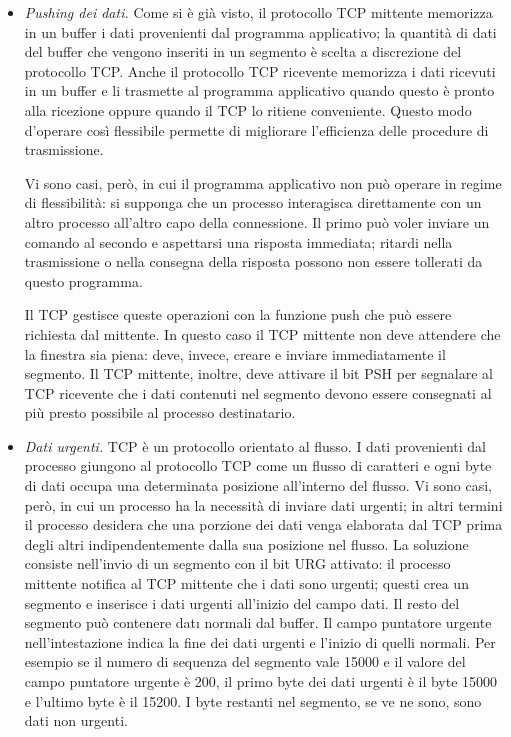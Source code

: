 \begin{itemize}
    \item \textit{Pushing dei dati.} Come si è già visto, il protocollo TCP mittente memorizza in un buffer i dati provenienti dal programma applicativo; la quantità di dati del buffer che vengono inseriti in un segmento è scelta a discrezione del protocollo TCP. Anche il protocollo TCP ricevente memorizza i dati ricevuti in un buffer e li trasmette al programma applicativo quando questo è pronto alla ricezione oppure quando il TCP lo ritiene conveniente. Questo modo d'operare così flessibile permette di migliorare l'efficienza delle procedure di trasmissione.

    Vi sono casi, però, in cui il programma applicativo non può operare in regime di flessibilità: si supponga che un processo interagisca direttamente con un altro processo all'altro capo della connessione. Il primo può voler inviare un comando al secondo e aspettarsi una risposta immediata; ritardi nella trasmissione o nella consegna della risposta possono non essere tollerati da questo programma.

    Il TCP gestisce queste operazioni con la funzione push che può essere richiesta dal mittente. In questo caso il TCP mittente non deve attendere che la finestra sia piena: deve, invece, creare e inviare immediatamente il segmento. Il TCP mittente, inoltre, deve attivare il bit PSH per segnalare al TCP ricevente che i dati contenuti nel segmento devono essere consegnati al più presto possibile al processo destinatario.

    \item \textit{Dati urgenti.} TCP è un protocollo orientato al flusso. I dati provenienti dal processo giungono al protocollo TCP come un flusso di caratteri e ogni byte di dati occupa una determinata posizione all'interno del flusso. Vi sono casi, però, in cui un processo ha la necessità di inviare dati urgenti; in altri termini il processo desidera che una porzione dei dati venga elaborata dal TCP prima degli altri indipendentemente dalla sua posizione nel flusso. La soluzione consiste nell'invio di un segmento con il bit URG attivato: il processo mittente notifica al TCP mittente che i dati sono urgenti; questi crea un segmento e inserisce i dati urgenti all'inizio del campo dati. Il resto del segmento può contenere datı normali dal buffer. Il campo puntatore urgente nell'intestazione indica la fine dei dati urgenti e l'inizio di quelli normali. Per esempio se il numero di sequenza del segmento vale 15000 e il valore del campo puntatore urgente è 200, il primo byte dei dati urgenti è il byte 15000 e l'ultimo byte è il 15200. I byte restanti nel segmento, se ve ne sono, sono dati non urgenti.
\end{itemize}


